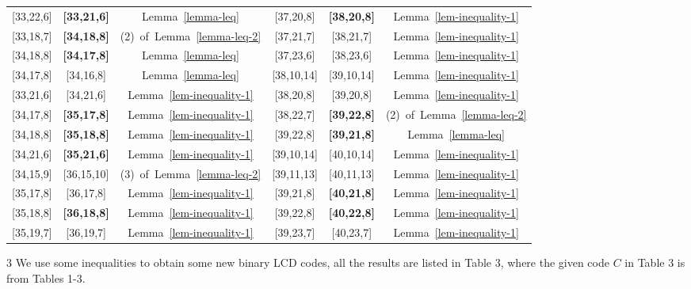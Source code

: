 \documentclass[12pt,twoside]{article}
\theoremstyle{plain}
\theoremstyle{definition}
\theoremstyle{remark}
\begin{document}
{\begin{center}
\begin{threeparttable}
\begin{tabular}{ccc||ccc}
[33,22,6] & {\bf[33,21,6]} & {\rm Lemma\ \ref{lemma-leq}}&[37,20,8]&{\bf[38,20,8]}&{\rm Lemma\ \ref{lem-inequality-1}}\\

[33,18,7] & {\bf[34,18,8]} & {\rm (2)\ of\ Lemma\ \ref{lemma-leq-2}}&
[37,21,7]&[38,21,7]&{\rm Lemma\ \ref{lem-inequality-1}}\\

[34,18,8] & {\bf[34,17,8]} & {\rm Lemma\ \ref{lemma-leq}}&[37,23,6]&[38,23,6]&{\rm Lemma\ \ref{lem-inequality-1}}\\

[34,17,8] & [34,16,8] & {\rm Lemma\ \ref{lemma-leq}}&
[38,10,14]&[39,10,14]&{\rm Lemma\ \ref{lem-inequality-1}}\\

[33,21,6] & [34,21,6] & {\rm Lemma\ \ref{lem-inequality-1}}&
[38,20,8]&[39,20,8]&{\rm Lemma\ \ref{lem-inequality-1}}\\

[34,17,8] & {\bf[35,17,8]} & {\rm Lemma\ \ref{lem-inequality-1}}&
[38,22,7]&{\bf[39,22,8]}&{\rm (2)\ of\ Lemma\ \ref{lemma-leq-2}}\\

[34,18,8] & {\bf[35,18,8]} & {\rm Lemma\ \ref{lem-inequality-1}}&[39,22,8]&{\bf[39,21,8]}&{\rm Lemma\ \ref{lemma-leq}}\\

[34,21,6] & {\bf[35,21,6]} & {\rm Lemma\ \ref{lem-inequality-1}}&
[39,10,14]&[40,10,14]&{\rm Lemma\ \ref{lem-inequality-1}}\\

[34,15,9] & [36,15,10] & {\rm (3)\ of\ Lemma\ \ref{lemma-leq-2}}&[39,11,13]&[40,11,13]&{\rm Lemma\ \ref{lem-inequality-1}}\\

[35,17,8] & [36,17,8] & {\rm Lemma\ \ref{lem-inequality-1}}&
[39,21,8]&{\bf[40,21,8]}&{\rm Lemma\ \ref{lem-inequality-1}}\\

[35,18,8] & {\bf[36,18,8]} & {\rm Lemma\ \ref{lem-inequality-1}}&[39,22,8]&{\bf[40,22,8]} &{\rm Lemma\ \ref{lem-inequality-1}}\\

[35,19,7] & [36,19,7] & {\rm Lemma\ \ref{lem-inequality-1}}&
[39,23,7]&[40,23,7]&{\rm Lemma\ \ref{lem-inequality-1}}\\
\hline
\end{tabular}
\begin{tablenotes}
\footnotesize
\item [3] {\small We use some inequalities to obtain some new binary LCD codes, all the results are listed in Table 3, where the given code $C$ in Table 3 is from Tables 1-3.}
\end{tablenotes}
\end{threeparttable}
\end{center}}
\end{document}
